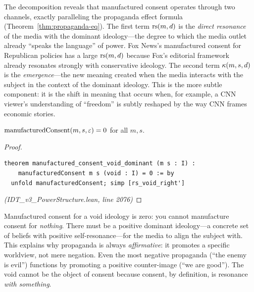 \begin{remark}
The decomposition reveals that manufactured consent operates through two
channels, exactly paralleling the propaganda effect formula
(Theorem~\ref{thm:propaganda-eq}). The first term $\mathrm{rs}(m, d)$ is the
\emph{direct resonance} of the media with the dominant ideology---the degree
to which the media outlet already ``speaks the language'' of power. Fox News's
manufactured consent for Republican policies has a large $\mathrm{rs}(m, d)$ because
Fox's editorial framework already resonates strongly with conservative
ideology. The second term $\kappa(m, s, d)$ is the \emph{emergence}---the
new meaning created when the media interacts with the subject in the context
of the dominant ideology. This is the more subtle component: it is the shift
in meaning that occurs when, for example, a CNN viewer's understanding of
``freedom'' is subtly reshaped by the way CNN frames economic stories.
\end{remark}

\begin{theorem}
\label{thm:consent-void-dominant}
$\mathrm{manufacturedConsent}(m, s, \varepsilon) = 0$ for all $m, s$.
\end{theorem}

\begin{proof}
\begin{lstlisting}
theorem manufactured_consent_void_dominant (m s : I) :
    manufacturedConsent m s (void : I) = 0 := by
  unfold manufacturedConsent; simp [rs_void_right']
\end{lstlisting}
\textit{(IDT\_v3\_PowerStructure.lean, line 2076)}
\end{proof}

\begin{interpretation}
Manufactured consent for a void ideology is zero: you cannot manufacture
consent for \emph{nothing}. There must be a positive dominant ideology---a
concrete set of beliefs with positive self-resonance---for the media to align
the subject with. This explains why propaganda is always \emph{affirmative}:
it promotes a specific worldview, not mere negation. Even the most negative
propaganda (``the enemy is evil'') functions by promoting a positive
counter-image (``we are good''). The void cannot be the object of consent
because consent, by definition, is resonance \emph{with something}.
\end{interpretation}

